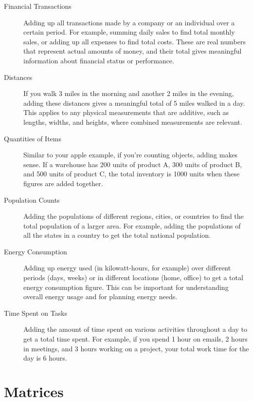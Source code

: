 \documentclass{ximera}
\begin{document}
\begin{description}
\item[Financial Transactions] Adding up all transactions made by a
  company or an individual over a certain period. For example, summing
  daily sales to find total monthly sales, or adding up all expenses
  to find total costs. These are real numbers that represent actual
  amounts of money, and their total gives meaningful information about
  financial status or performance.
\item[Distances] If you walk 3 miles in the morning and another 2
  miles in the evening, adding these distances gives a meaningful
  total of 5 miles walked in a day. This applies to any physical
  measurements that are additive, such as lengths, widths, and
  heights, where combined measurements are relevant.
\item[Quantities of Items] Similar to your apple example, if you're
  counting objects, adding makes sense. If a warehouse has 200 units
  of product A, 300 units of product B, and 500 units of product C,
  the total inventory is 1000 units when these figures are added
  together.
\item[Population Counts] Adding the populations of different regions,
  cities, or countries to find the total population of a larger
  area. For example, adding the populations of all the states in a
  country to get the total national population.
\item[Energy Consumption] Adding up energy used (in kilowatt-hours,
  for example) over different periods (days, weeks) or in different
  locations (home, office) to get a total energy consumption
  figure. This can be important for understanding overall energy usage
  and for planning energy needs.
\item[Time Spent on Tasks] Adding the amount of time spent on various
  activities throughout a day to get a total time spent. For example,
  if you spend 1 hour on emails, 2 hours in meetings, and 3 hours
  working on a project, your total work time for the day is 6 hours.
\end{description}



\section{Matrices}
\end{document}
